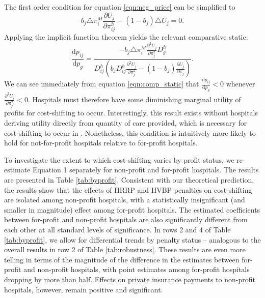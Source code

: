 \documentclass[12pt]{article}
\newcommand{\deriv}[2]{\frac{\mathrm{d}#1}{\mathrm{d}#2}}
\newcommand{\pderiv}[2]{\frac{\partial#1}{\partial#2}}
\begin{document}
The first order condition for equation \ref{eqn:neg_price} can be simplified to
\begin{equation}
 b_{j} \triangle \pi_{i}^{M} \pderiv{U_{j}}{\pi_{ij}^{h}} - (1-b_{j}) \triangle U_{j} = 0.
\label{eqn:price_foc}
\end{equation}
Applying the implicit function theorem yields the relevant comparative static:
\begin{equation}
\deriv{p_{ij}}{p_{g}} = \frac{- b_{j} \triangle \pi_{i}^{M} \pderiv{^{2}U_{j}}{\pi_{j}^{2}}D_{g}^{h}}{D_{ij}^{h}\left(b_{j} D_{ij}^{h} \pderiv{^{2}U_{j}}{\pi_{j}^{2}} - (1-b_{j}) \pderiv{U_{j}}{\pi_{j}} \right)}.
\label{eqn:comp_static}
\end{equation}
We can see immediately from equation \ref{eqn:comp_static} that $\deriv{p_{ij}}{p_{g}}<0$ whenever $\pderiv{^{2}U_{j}}{\pi_{j}^{2}}<0$. Hospitals must therefore have some diminishing marginal utility of profits for cost-shifting to occur. Interestingly, this result exists without hospitals deriving utility directly from quantity of care provided, which is necessary for cost-shifting to occur in \cite{dranove1988}. Nonetheless, this condition is intuitively more likely to hold for not-for-profit hospitals relative to for-profit hospitals.

To investigate the extent to which cost-shifting varies by profit status, we re-estimate Equation 1 separately for non-profit and for-profit hospitals.  The results are presented in Table \ref{tab:byprofit}.  Consistent with our theoretical prediction, the results show that the effects of HRRP and HVBP penalties on cost-shifting are isolated among non-profit hospitals, with a statistically insignificant (and smaller in magnitude) effect among for-profit hospitals. The estimated coefficients between for-profit and non-profit hospitals are also significantly different from each other at all standard levels of significance. In rows 2 and 4 of Table \ref{tab:byprofit}, we allow for differential trends by penalty status -- analogous to the overall results in row 2 of Table \ref{tab:robustness}. These results are even more telling in terms of the magnitude of the difference in the estimates between for-profit and non-profit hospitals, with point estimates among for-profit hospitals dropping by more than half. Effects on private insurance payments to non-profit hospitals, however, remain positive and significant.
\end{document}
